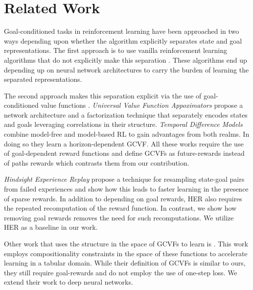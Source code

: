 \section{Related Work}

Goal-conditioned tasks in reinforcement learning have been approached in two
ways depending upon whether the algorithm explicitly separates state and goal
representations.
The first approach is to use vanilla reinforcement
learning algorithms that do not explicitly make this separation
\citep{mirowski2016learning,dosovitskiy2016learning,gupta2017cognitive,parisotto2017neural,mirowski2018learning}.
These algorithms end up depending up on neural network architectures to
carry the burden of learning the separated representations.

The second approach makes this separation explicit via the use of goal-conditioned value
functions \citep{foster2002structure,sutton2011horde}. \emph{Universal
Value Function Appoximators} \citep{schaul2015universal} propose a
network architecture and a factorization technique that separately
encodes states and goals leveraging correlations in their structure.
\emph{Temporal Difference Models} combine model-free
and model-based RL to gain advantages from both realms. In doing so they
learn a horizon-dependent GCVF. All these works require the use of
goal-dependent reward functions and define GCVFs as future-rewards instead of
paths rewards which contrasts them from our contribution. 

\emph{Hindsight Experience Replay} \citep{andrychowicz2017hindsight}
propose a technique for resampling state-goal pairs from failed
experiences and show how this leads to faster learning in the presence
of sparse rewards. In addition to depending on goal rewards, HER also
requires the repeated recomputation of the reward function. In contrast,
we show how removing goal rewards removes the need for such
recomputations.
We utilize HER as a baseline in our work. 

Other work that uses the structure in the space of GCVFs to learn is
\citet{dhiman2018floydwarshall}. This work employs compositionality constraints
in the space of these functions to accelerate learning in a tabular domain. While
their definition of GCVFs is similar to ours, they still require
goal-rewards and do not employ the use of one-step loss. We extend their
work to deep neural networks.


